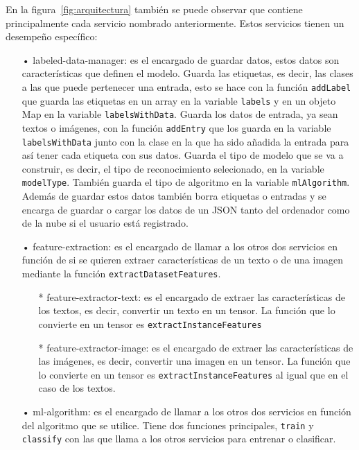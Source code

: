 \documentclass[a4paper, 12pt]{book}
\begin{document}
En la figura~\ref{fig:arquitectura} también se puede observar que contiene principalmente cada servicio nombrado anteriormente. Estos servicios tienen un desempeño específico:

\begin{itemize}
	\item[•] labeled-data-manager: es el encargado de guardar datos, estos datos son características que definen el modelo. Guarda las etiquetas, es decir, las clases a las que puede pertenecer una entrada, esto se hace con la función \texttt{addLabel} que guarda las etiquetas en un array en la variable \texttt{labels} y en un objeto Map en la variable \texttt{labelsWithData}. Guarda los datos de entrada, ya sean textos o imágenes, con la función \texttt{addEntry} que los guarda en la variable \texttt{labelsWithData} junto con la clase en la que ha sido añadida la entrada para así tener cada etiqueta con sus datos. Guarda el tipo de modelo que se va a construir, es decir, el tipo de reconocimiento selecionado, en la variable \texttt{modelType}. También guarda el tipo de algoritmo en la variable \texttt{mlAlgorithm}. Además de guardar estos datos también borra etiquetas o entradas y se encarga de guardar o cargar los datos de un JSON tanto del ordenador como de la nube si el usuario está registrado.
	
	\item[•] feature-extraction: es el encargado de llamar a los otros dos servicios en función de si se quieren extraer características de un texto o de una imagen mediante la función \texttt{extractDatasetFeatures}.
	
	\begin{itemize}
		\item[*] feature-extractor-text: es el encargado de extraer las características de los textos, es decir, convertir un texto en un tensor. La función que lo convierte en un tensor es \texttt{extractInstanceFeatures}
		
		\item[*] feature-extractor-image: es el encargado de extraer las características de las imágenes, es decir, convertir una imagen en un tensor. La función que lo convierte en un tensor es \texttt{extractInstanceFeatures} al igual que en el caso de los textos.
	\end{itemize}
	
	\item[•] ml-algorithm: es el encargado de llamar a los otros dos servicios en función del algoritmo que se utilice. Tiene dos funciones principales, \texttt{train} y \texttt{classify} con las que llama a los otros servicios para entrenar o clasificar.
	

\end{itemize}
\end{document}
